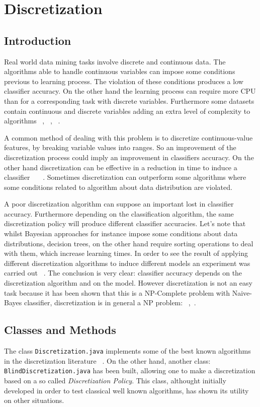 \section{Discretization}
\subsection{Introduction}
Real world data mining tasks involve discrete and continuous data. The algorithms able to handle continuous 
variables can impose some conditions previous to learning process. The violation of these conditions
produces a low classifier accuracy. On the other hand the learning process can require more CPU than for a 
corresponding task with discrete variables. Furthermore some datasets contain continuous 
and discrete variables adding an extra level of complexity to algorithms ~\cite{weiss91},
~\cite{catlett91b}, ~\cite{michalski78}.

A common method of dealing with this problem is to discretize continuous-value features, by 
breaking variable values into ranges. So an improvement of the discretization process could 
imply an improvement in classifiers accuracy. On the other hand discretization can be effective 
in a reduction in time to induce a classifier ~\cite{catlett91b}~\cite{dougherty95}~\cite{fayyad93}. 
Sometimes discretization can outperform some algorithms where some conditions related to algorithm about 
data distribution are violated.

A poor discretization algorithm can suppose an important lost in classifier accuracy. Furthermore 
depending on the classification algorithm, the same discretization policy will produce different classifier accuracies. 
Let's note that whilst Bayesian approaches for instance impose some conditions about data 
distributions, decision trees, on the other hand require sorting operations to deal with them, which 
increase learning times. In order to see the result of applying different discretization algorithms to 
induce different models an experiment was carried out ~\cite{dougherty95}. The conclusion is very 
clear: classifier accuracy depends on the discretization algorithm and on the model. However discretization 
is not an easy task because it has been shown that this is a NP-Complete problem 
with Naive-Bayes classifier, discretization is in general a NP problem: ~\cite{pazzani95},~\cite{elomaa03}. 

\subsection{Classes and Methods}
The class \verb=Discretization.java= implements some of the best known algorithms in the discretization
literature ~\cite{dougherty95}. On the other hand, another class: \verb=BlindDiscretization.java= 
has been built, allowing one to make a discretization based on a so called \emph{Discretization Policy}. 
This class, althought initially developed in order to test classical well known algorithms, has shown its utility
on other situations.

